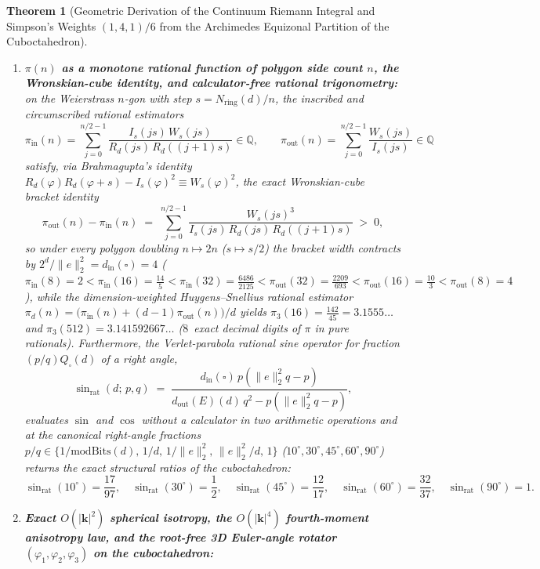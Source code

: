 \documentclass[11pt,a4paper]{article}
\theoremstyle{plain}
\newtheorem{theorem}{Theorem}[section]
\theoremstyle{definition}
\begin{document}
\begin{theorem}[Geometric Derivation of the Continuum Riemann Integral and Simpson's Weights $(1,4,1)/6$ from the Archimedes Equizonal Partition of the Cuboctahedron]
\begin{enumerate}[label=\textbf{(\roman*)},leftmargin=*]
\item \textbf{$\pi(n)$ as a monotone rational function of polygon side count $n$, the Wronskian-cube identity, and calculator-free rational trigonometry:}
  on the Weierstrass $n$-gon with step $s = N_{\mathrm{ring}}(d)/n$, the inscribed and circumscribed rational estimators
  \[
    \pi_{\mathrm{in}}(n) = \sum_{j=0}^{n/2-1}\frac{I_s(js)\,W_s(js)}{R_d(js)\,R_d((j+1)s)}\in\mathbb{Q},\qquad
    \pi_{\mathrm{out}}(n) = \sum_{j=0}^{n/2-1}\frac{W_s(js)}{I_s(js)}\in\mathbb{Q}
  \]
  satisfy, via Brahmagupta's identity $R_d(\varphi)R_d(\varphi+s)-I_s(\varphi)^2 \equiv W_s(\varphi)^2$, the exact \emph{Wronskian-cube bracket identity}
  \begin{equation}
    \label{eq:wronskian-cube-pi-gap}
    \pi_{\mathrm{out}}(n) - \pi_{\mathrm{in}}(n) \;=\; \sum_{j=0}^{n/2-1}\frac{W_s(js)^3}{I_s(js)\,R_d(js)\,R_d((j+1)s)} \;>\; 0,
  \end{equation}
  so under every polygon doubling $n\mapsto 2n$ ($s\mapsto s/2$) the bracket width contracts by $2^d/\|e\|_2^2 = d_{\mathrm{in}}(\square) = 4$ ($\pi_{\mathrm{in}}(8)=2 < \pi_{\mathrm{in}}(16)=\frac{14}{5} < \pi_{\mathrm{in}}(32)=\frac{6486}{2125} < \pi_{\mathrm{out}}(32)=\frac{2209}{693} < \pi_{\mathrm{out}}(16)=\frac{10}{3} < \pi_{\mathrm{out}}(8)=4$), while the dimension-weighted Huygens--Snellius rational estimator $\pi_d(n) = \bigl(\pi_{\mathrm{in}}(n)+(d-1)\pi_{\mathrm{out}}(n)\bigr)/d$ yields $\pi_3(16) = \frac{142}{45} = 3.1555\dots$ and $\pi_3(512) = 3.141592667\dots$ ($8$~exact decimal digits of $\pi$ in pure rationals). Furthermore, the Verlet-parabola rational sine operator for fraction $(p/q)Q_\square(d)$ of a right angle,
  \[
    \sin_{\mathrm{rat}}(d;\,p,q) \;=\; \frac{d_{\mathrm{in}}(\square)\,p(\|e\|_2^2 q - p)}{d_{\mathrm{out}}(E)(d)\,q^2 - p(\|e\|_2^2 q - p)},
  \]
  evaluates $\sin$ and $\cos$ without a calculator in two arithmetic operations and at the canonical right-angle fractions $p/q\in\{1/\mathrm{modBits}(d),\,1/d,\,1/\|e\|_2^2,\,\|e\|_2^2/d,\,1\}$ ($10^\circ,30^\circ,45^\circ,60^\circ,90^\circ$) returns the exact structural ratios of the cuboctahedron:
  \[
    \sin_{\mathrm{rat}}(10^\circ) = \frac{17}{97},\quad
    \sin_{\mathrm{rat}}(30^\circ) = \frac{1}{2},\quad
    \sin_{\mathrm{rat}}(45^\circ) = \frac{12}{17},\quad
    \sin_{\mathrm{rat}}(60^\circ) = \frac{32}{37},\quad
    \sin_{\mathrm{rat}}(90^\circ) = 1.
  \]
\item \textbf{Exact $O(|\mathbf{k}|^2)$ spherical isotropy, the $O(|\mathbf{k}|^4)$ fourth-moment anisotropy law, and the root-free 3D Euler-angle rotator $(\varphi_1,\varphi_2,\varphi_3)$ on the cuboctahedron:}

\end{enumerate}
\end{theorem}
\end{document}
